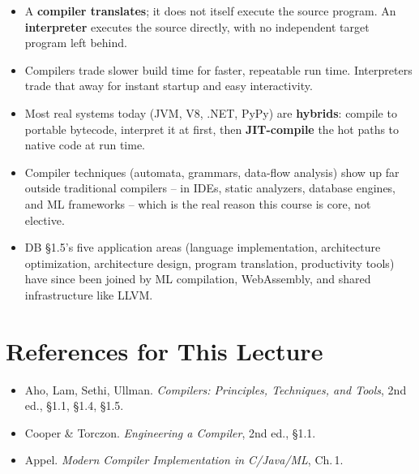 \documentclass[11pt]{article}
\begin{document}
\begin{takeaways}
\begin{itemize}
  \item A \textbf{compiler translates}; it does not itself execute the source program. An
  \textbf{interpreter} executes the source directly, with no independent target program left
  behind.
  \item Compilers trade slower build time for faster, repeatable run time. Interpreters trade
  that away for instant startup and easy interactivity.
  \item Most real systems today (JVM, V8, .NET, PyPy) are \textbf{hybrids}: compile to portable
  bytecode, interpret it at first, then \textbf{JIT-compile} the hot paths to native code at run
  time.
  \item Compiler techniques (automata, grammars, data-flow analysis) show up far outside
  traditional compilers -- in IDEs, static analyzers, database engines, and ML frameworks -- which
  is the real reason this course is core, not elective.
  \item DB \S1.5's five application areas (language implementation, architecture optimization,
  architecture design, program translation, productivity tools) have since been joined by
  ML compilation, WebAssembly, and shared infrastructure like LLVM.
\end{itemize}
\end{takeaways}

\section*{References for This Lecture}
\begin{itemize}
  \item [DB] Aho, Lam, Sethi, Ullman. \textit{Compilers: Principles, Techniques, and Tools}, 2nd ed., \S1.1, \S1.4, \S1.5.
  \item [ET] Cooper \& Torczon. \textit{Engineering a Compiler}, 2nd ed., \S1.1.
  \item [AP] Appel. \textit{Modern Compiler Implementation in C/Java/ML}, Ch.\,1.
\end{itemize}
\end{document}

